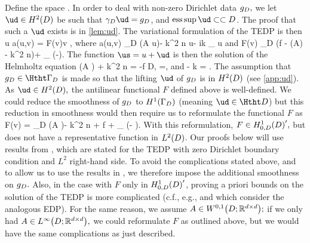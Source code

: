 Define the space
\beqs
\HozDD \de {}.
\eeqs
%
%
%
%
In order to deal with non-zero Dirichlet data $g_{D},$ we let  $\ud \in \HtD$ be such that $\trGD \ud = \gD$, and $\esssup \ud \compcont D$. The proof that such a $\ud$ exists is in \cref{lem:ud}.
The variational formulation of the TEDP is then
\beq\label{eq:tedp}
 u \in \HozDD\quad \tst\quad a(u,v) = F(v)\quad \tfa v \in \HozDD,
\eeq
where
\beqs
a(u,v) \de \int_D \mleft(A \grad u\mright)\cdot \grad \vb - k^2 n u\vb - ik \int_{\GI} \trGI u \trGI \vb
\eeqs
and
\beqs
F(v) \de  \int_D \mleft(f - \grad \cdot \mleft(A\grad \ud\mright) - k^2 n\ud\mright)\vb + \int_{\GI} \mleft(\gI-\dn\ud\mright)\trGI \vb.
\eeqs
The function $\us = u+ \ud$ is then the solution of the Helmholtz equation
\beqs
\grad\cdot\mleft(A \grad \us \mright) + k^2 n \us = -f \quad \tin D,
\eeqs
\beqs
\trGD \us =\gD \quad\ton \GD,
\eeqs
and 
\beq\label{eq:TEDP3}
\dn \us - \ii k  \trGI \us = \gI \ton \GI.
\eeq
{}
The assumption that $\gD \in \HthtGD$ is made so that the lifting $\ud$ of $g_{D}$ is in $\HtD$ (see \cref{app:ud}). As $\ud \in \HtD,$ the antilinear functional $F$ defined above is well-defined. We could reduce the smoothness of $g_{D}$ to $\HoGD$ (meaning $\ud \in \HthtD$) but this reduction in smoothness would then require us to reformulate the functional $F$ as
\beqs
F(v) = \int_D \mleft(A \grad \ud\mright)\cdot \grad \vb - k^2 n \ud \vb + f \vb + \int_{\GI} \mleft(\gI - \dn \ud\mright)\vb.
\eeqs{}
With this reformulation, $F \in \HozDDprime,$ but does not have a representative function in $\LtD$. Our proofs below will use results from \cite{ChNiTo:18}, which are stated for the TEDP with zero Dirichlet boundary condition and $L^2$ right-hand side. To avoid the complications stated above, and to allow us to use the results in \cite{ChNiTo:18}, we therefore impose the additional smoothness on $g_{D}.$ Also, in the case with $F$ only in $\HozDDprime$, proving a priori bounds on the solution of the TEDP is more complicated (c.f., e.g., \cite[Theorem 2.5]{GrPeSp:18} and \cite[Corollary 2.16]{GrPeSp:18} which consider the analogous EDP). For the same reason, we assume $A \in \WoiDRRdtd;$ if we only had $A \in \LiDRRdtd,$ we could reformulate $F$ as outlined above, but we would have the same complications as just described.

